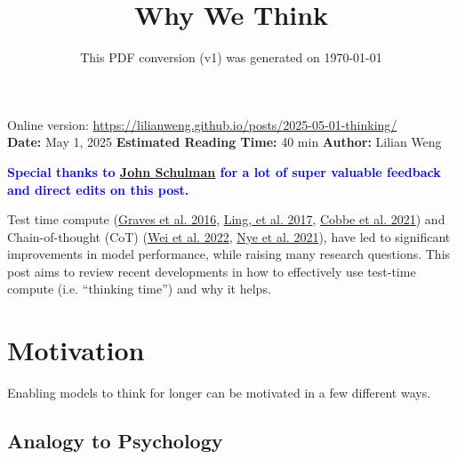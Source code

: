 \documentclass[12pt]{article}
\title{Why We Think}
\date{This PDF conversion (v1) was generated on \today\footnotemark}
\begin{document}
\maketitle
\begin{center}
    Online version: \url{https://lilianweng.github.io/posts/2025-05-01-thinking/} \\
    \textbf{Date:} May 1, 2025 \quad
    \textbf{Estimated Reading Time:} 40 min \quad
    \textbf{Author:} Lilian Weng
\end{center}

\noindent
\textcolor{blue}{\textbf{Special thanks to \href{https://twitter.com/jesse\_john\_schulman}{John Schulman} for a lot of super valuable feedback and direct edits on this post.}}

Test time compute (\href{https://arxiv.org/abs/1603.08983}{Graves et al. 2016}, \href{https://arxiv.org/abs/1705.04146}{Ling, et al. 2017}, \href{https://arxiv.org/abs/2110.14168}{Cobbe et al. 2021}) and Chain-of-thought (CoT) (\href{https://arxiv.org/abs/2201.11903}{Wei et al. 2022}, \href{https://arxiv.org/abs/2112.00114}{Nye et al. 2021}), have led to significant improvements in model performance, while raising many research questions. This post aims to review recent developments in how to effectively use test-time compute (i.e. ``thinking time'') and why it helps.


\newpage
\tableofcontents
\newpage
\vspace{1em}



\section{Motivation}

Enabling models to think for longer can be motivated in a few different ways.

\subsection{Analogy to Psychology}
\end{document}
